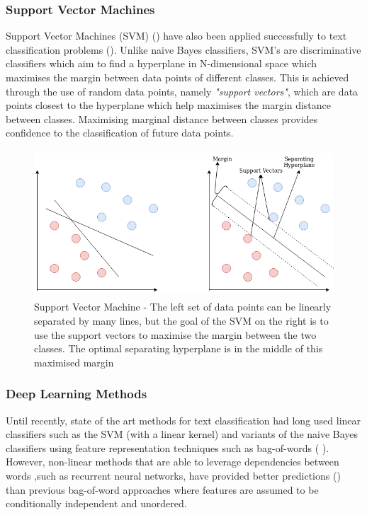 \subsubsection{Support Vector Machines}
Support Vector Machines (SVM) (\cite{Cortes1995}) have also been applied successfully to text classification problems (\cite{Joachims1998}). Unlike naive Bayes classifiers, SVM's are discriminative classifiers which aim to find a hyperplane in N-dimensional space which maximises the margin between data points of different classes. This is achieved through the use of random data points, namely \textit{"support vectors"}, which are data points closest to the hyperplane which help maximises the margin distance between classes. Maximising marginal distance between classes provides confidence to the classification of future data points.

\noindent
\newline 
\begin{figure}[ht]
	\includegraphics[width=12cm, height=5.5cm]{./figures/fig17}
	\centering
	\caption[Support Vector Machine]{Support Vector Machine - The left set of data points can be linearly separated by many lines, but the goal of the SVM on the right is to use the support vectors to maximise the margin between the two classes. The optimal separating hyperplane is in the middle of this maximised margin}
	\label{fig:fig17}
\end{figure}

\subsubsection{Deep Learning Methods}
Until recently, state of the art methods for text classification had long used linear classifiers such as the SVM (with a linear kernel) and variants of the naive Bayes classifiers using feature representation techniques such as bag-of-words (\cite{Joachims1998} \cite{Lewis2004}). However, non-linear methods that are able to leverage dependencies between words ,such as recurrent neural networks, have provided better predictions (\cite{Dai2015a}) than previous bag-of-word approaches where features are assumed to be conditionally independent and unordered. 